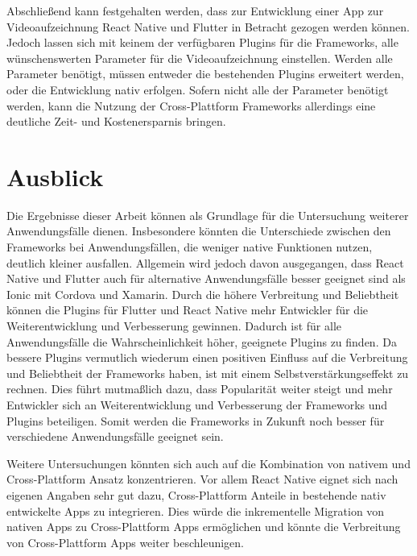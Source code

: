 Abschließend kann festgehalten werden, dass zur Entwicklung einer App zur Videoaufzeichnung React Native und Flutter in Betracht gezogen werden können.
Jedoch lassen sich mit keinem der verfügbaren Plugins für die Frameworks, alle wünschenswerten Parameter für die Videoaufzeichnung einstellen.
Werden alle Parameter benötigt, müssen entweder die bestehenden Plugins erweitert werden, oder die Entwicklung nativ erfolgen.
Sofern nicht alle der Parameter benötigt werden, kann die Nutzung der Cross-Plattform Frameworks allerdings eine deutliche Zeit- und Kostenersparnis bringen.


\section{Ausblick}

Die Ergebnisse dieser Arbeit können als Grundlage für die Untersuchung weiterer Anwendungsfälle dienen.
Insbesondere könnten die Unterschiede zwischen den Frameworks bei Anwendungsfällen, die weniger native Funktionen nutzen, deutlich kleiner ausfallen.
Allgemein wird jedoch davon ausgegangen, dass React Native und Flutter auch für alternative Anwendungsfälle besser geeignet sind als Ionic mit Cordova und Xamarin.
Durch die höhere Verbreitung und Beliebtheit können die Plugins für Flutter und React Native mehr Entwickler für die Weiterentwicklung und Verbesserung gewinnen.
Dadurch ist für alle Anwendungsfälle die Wahrscheinlichkeit höher, geeignete Plugins zu finden.
Da bessere Plugins vermutlich wiederum einen positiven Einfluss auf die Verbreitung und Beliebtheit der Frameworks haben, ist mit einem Selbstverstärkungseffekt zu rechnen.
Dies führt mutmaßlich dazu, dass Popularität weiter steigt und mehr Entwickler sich an Weiterentwicklung und Verbesserung der Frameworks und Plugins beteiligen.
Somit werden die Frameworks in Zukunft noch besser für verschiedene Anwendungsfälle geeignet sein.

Weitere Untersuchungen könnten sich auch auf die Kombination von nativem und Cross-Plattform Ansatz konzentrieren.
Vor allem React Native eignet sich nach eigenen Angaben sehr gut dazu, Cross-Plattform Anteile in bestehende nativ entwickelte Apps zu integrieren.
Dies würde die inkrementelle Migration von nativen Apps zu Cross-Plattform Apps ermöglichen und könnte die Verbreitung von Cross-Plattform Apps weiter beschleunigen.